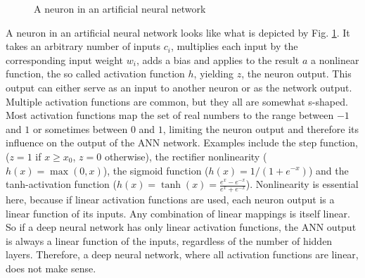 \begin{figure}[h]
	\centering
	\label{tikz:neuron}
	\caption{A neuron in an artificial neural network}
\end{figure}

A neuron in an artificial neural network looks like what is depicted by Fig. \ref{tikz:neuron}. It takes an arbitrary number of inputs $c_i$, multiplies each input by the corresponding input weight $w_i$, adds a bias and applies to the result $a$ a nonlinear function, the so called activation function $h$, yielding $z$, the neuron output. This output can either serve as an input to another neuron or as the network output. Multiple activation functions are common, but they all are somewhat s-shaped. Most activation functions map the set of real numbers to the range between $-1$ and $1$ or sometimes between $0$ and $1$, limiting the neuron output and therefore its influence on the output of the ANN network. Examples include the step function, ($z=1$ if $x \geq x_0$, $z=0$ otherwise), the rectifier nonlinearity ($h(x)=\max(0,x)$), the sigmoid function ($h(x)=1/(1+e^{-x})$) and the tanh-activation function ($h(x)=\tanh(x)=\frac{e^x-e^{-x}}{e^x+e^{-x}}$).
Nonlinearity is essential here, because if linear activation functions are used, each neuron output is a linear function of its inputs. Any combination of linear mappings is itself linear. So if a deep neural network has only linear activation functions, the ANN output is always a linear function of the inputs, regardless of the number of hidden layers. Therefore, a deep neural network, where all activation functions are linear, does not make sense.

